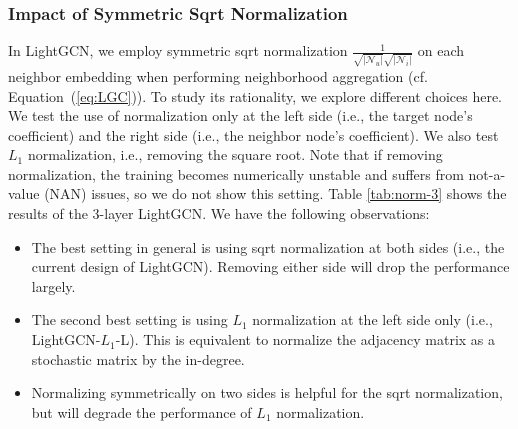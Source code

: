 \subsubsection{Impact of Symmetric Sqrt Normalization}\label{ss:ablation-symmetric}
In LightGCN, we employ symmetric sqrt normalization $\frac{1}{\sqrt{|\mathcal{N}_u|}\sqrt{|\mathcal{N}_i|}}$ on each neighbor embedding when performing neighborhood aggregation (cf. Equation~(\ref{eq:LGC})). To study its rationality, we explore different choices here. We test the use of normalization only at the left side (i.e., the target node's coefficient) and the right side (i.e., the neighbor node's coefficient). 
We also test $L_1$ normalization, i.e.,  removing the square root. 
Note that if removing normalization, the training becomes numerically unstable and suffers from not-a-value (NAN) issues, so we do not show this setting. 
Table \ref{tab:norm-3} shows the results of the 3-layer LightGCN. %
We have the following observations:
\begin{itemize}[leftmargin=*]
    \item The best setting in general is using sqrt normalization at both sides (i.e., the current design of LightGCN). Removing either side will drop the performance largely.
    \item The second best setting is using $L_1$ normalization at the left side only (i.e., LightGCN-$L_1$-L). This is equivalent to normalize the adjacency matrix as a stochastic matrix by the in-degree. 
    \item Normalizing symmetrically on two sides is helpful for the sqrt normalization, but will degrade the performance of $L_1$ normalization. 
\end{itemize}

